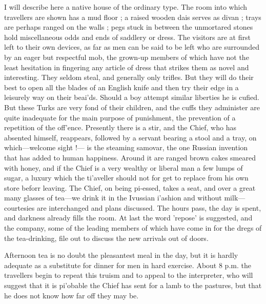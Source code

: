 \documentclass{article}
\begin{document}
	I will describe here a native house of the ordinary type. The room into which travellers are shown has a mud floor ; a raised wooden dais serves as divan ; trays are perhaps ranged on the walls ; pegs stuck in between the unmortared stones hold miscellaneous odds and ends of saddlery or dress. The visitors are at first left to their own devices, as far as men can be said to be left who are surrounded by an eager but respectful mob, the grown-up members of which have not the least hesitation in fingering any article of dress that strikes them as novel and interesting. They seldom steal, and generally only trifles. But they will do their best to open all the blades of an English knife and then try their edge in a leisurely way on their beai'ds. Should a boy attempt similar liberties he is cufied. But these Turks are very fond of their children, and the cuffs they administer are quite inadequate for the main purpose of punishment, the prevention of a repetition of the off'ence. Presently there is a stir, and the Chief, who has absented himself, reappears, followed by a servant bearing a stool and a tray, on which—welcome sight !— is the steaming samovar, the one Russian invention that has added to human happiness. Around it are ranged brown cakes smeared with honey, and if the Chief is a very wealthy or liberal man a few lumps of sugar, a luxury which the ti'aveller should not for get to replace from his own store beforr leaving. The Chief, on being pi-essed, takes a seat, and over a great many glasses of tea—we drink it in the Ivussian i'ashion and without milk— courtesies are interchanged and plans discussed. The hours pass, the day is spent, and darkness already fills the room. At last the word 'repose' is suggested, and the company, some of the leading members of which have come in for the dregs of the tea-drinking, file out to discuss the new arrivals out of doors.
	
	Afternoon tea is no doubt the pleasantest meal in the day, but it is hardly adequate as a substitute for dinner for men in hard exercise. About 8 p.m. the travellers begin to repeat this truism and to appeal to the interpreter, who will suggest that it is pi'obable the Chief has sent for a lamb to the pastures, but that he does not know how far off they may be.
	
\end{document}
